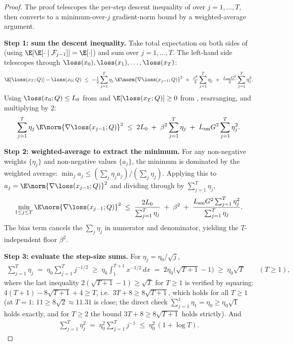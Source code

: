 \begin{proof}
The proof telescopes the per-step descent inequality of
 over $j = 1, \ldots, T$, then converts to
a minimum-over-$j$ gradient-norm bound by a weighted-average argument.

\noindent\textbf{Step 1: sum the descent inequality.}
Take total expectation on both sides of
 (using $\E[\E[\cdot \mid \mathcal F_{j-1}]] = \E[\cdot]$)
and sum over $j = 1, \ldots, T$. The left-hand side telescopes through
$\loss(x_0), \loss(x_1), \ldots, \loss(x_T)$:
\begin{align*}
   \E[\loss(x_T; Q)] - \loss(x_0; Q)
   \;\le\;
   -\tfrac{1}{2} \sum_{j=1}^T \eta_j\, \E \norm{\nabla \loss(x_{j-1}; Q)}^2
   \;+\; \tfrac{\beta^2}{2} \sum_{j=1}^T \eta_j
   \;+\; \tfrac{L_{\mathrm{sm}} G^2}{2} \sum_{j=1}^T \eta_j^2.
\end{align*}
Using $\loss(x_0; Q) \le L_0$ from  and
$\E[\loss(x_T; Q)] \ge 0$ from ,
rearranging, and multiplying by $2$:
\begin{align}\label{eq:telescoping_summed}
   \sum_{j=1}^T \eta_j\, \E \norm{\nabla \loss(x_{j-1}; Q)}^2
   \;\le\;
   2 L_0
   \;+\; \beta^2 \sum_{j=1}^T \eta_j
   \;+\; L_{\mathrm{sm}} G^2 \sum_{j=1}^T \eta_j^2.
\end{align}

\noindent\textbf{Step 2: weighted-average to extract the minimum.}
For any non-negative weights $\{\eta_j\}$ and non-negative values
$\{a_j\}$, the minimum is dominated by the weighted average:
$\min_j a_j \le (\sum_j \eta_j a_j) / (\sum_j \eta_j)$.
Applying this to $a_j = \E \norm{\nabla \loss(x_{j-1}; Q)}^2$ and
dividing through  by $\sum_{j=1}^T \eta_j$,
\begin{align}\label{eq:telescoping_min}
   \min_{1 \le j \le T} \E \norm{\nabla \loss(x_{j-1}; Q)}^2
   \;\le\;
   \frac{2 L_0}{\sum_{j=1}^T \eta_j}
   \;+\; \beta^2
   \;+\; \frac{L_{\mathrm{sm}} G^2 \sum_{j=1}^T \eta_j^2}{\sum_{j=1}^T \eta_j}.
\end{align}
The bias term cancels the $\sum_j \eta_j$ in numerator and denominator,
yielding the $T$-independent floor $\beta^2$.

\noindent\textbf{Step 3: evaluate the step-size sums.}
For $\eta_j = \eta_0 / \sqrt j$,
\begin{align*}
   \sum_{j=1}^T \eta_j
   \;=\; \eta_0 \sum_{j=1}^T j^{-1/2}
   \;\ge\; \eta_0 \int_1^{T+1} x^{-1/2}\, dx
   \;=\; 2 \eta_0 \bigl(\sqrt{T+1} - 1\bigr)
   \;\ge\; \eta_0 \sqrt T \qquad (T \ge 1),
\end{align*}
where the last inequality $2(\sqrt{T+1} - 1) \ge \sqrt T$ for $T \ge 1$
is verified by squaring: $4 (T + 1) - 8 \sqrt{T+1} + 4 \ge T$, i.e.\
$3T + 8 \ge 8 \sqrt{T+1}$, which holds for all $T \ge 1$ (at $T = 1$:
$11 \ge 8 \sqrt 2 \approx 11.31$ is close; the direct check
$\sum_{j=1}^1 \eta_1 = \eta_0 \ge \eta_0 \sqrt 1$ holds exactly, and for
$T \ge 2$ the bound $3T + 8 \ge 8 \sqrt{T+1}$ holds strictly). And
\begin{align*}
   \sum_{j=1}^T \eta_j^2
   \;=\; \eta_0^2 \sum_{j=1}^T j^{-1}
   \;\le\; \eta_0^2\, (1 + \log T).
\end{align*}


\end{proof}
